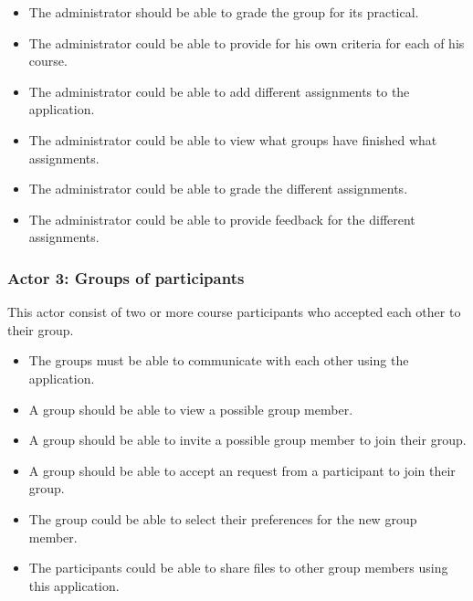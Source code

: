 \begin{itemize}
\item The administrator should be able to grade the group for its practical.
\item The administrator could be able to provide for his own criteria for each of his course.
\item The administrator could be able to add different assignments to the application.
\item The administrator could be able to view what groups have finished what assignments.
\item The administrator could be able to grade the different assignments.
\item The administrator could be able to provide feedback for the different assignments.
\end{itemize}



\subsubsection*{Actor 3: Groups of participants}
This actor consist of two or more course participants who accepted each other to their group.

\begin{itemize}
\item The groups must be able to communicate with each other using the application.
\end{itemize}

\begin{itemize}
\item A group should be able to view a possible group member.
\item A group should be able to invite a possible group member to join their group.
\item A group should be able to accept an request from a participant to join their group.
\end{itemize}

\begin{itemize}
\item The group could be able to select their preferences for the new group member.
\item The participants could be able to share files to other group members using this application.
\end{itemize}

